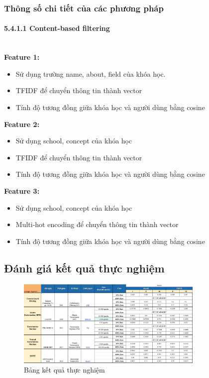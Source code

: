 \subsubsection{Thông số chi tiết của các phương pháp}
\paragraph{5.4.1.1  Content-based filtering}
\textbf{}\\
\textbf{Feature 1:} 
\begin{itemize}
    \item Sử dụng trường name, about, field của khóa học.
    \item TFIDF để chuyển thông tin thành vector
    \item Tính độ tương đồng giữa khóa học và người dùng bằng cosine
\end{itemize}
\textbf{Feature 2:}
\begin{itemize}
    \item Sử dụng school, concept của khóa học
    \item TFIDF để chuyển thông tin thành vector
    \item Tính độ tương đồng giữa khóa học và người dùng bằng cosine
\end{itemize}
\textbf{Feature 3:} 
\begin{itemize}
    \item Sử dụng school, concept của khóa học
    \item Multi-hot encoding để chuyển thông tin thành vector
    \item Tính độ tương đồng giữa khóa học và người dùng bằng cosine
\end{itemize}
\subsection{Đánh giá kết quả thực nghiệm}
\label{sec:ketqua}
\begin{figure}[h]
    \centering
    \includegraphics[width=0.8\textwidth]{figures/71.png}
    \caption{Bảng kết quả thực nghiệm}
\end{figure}
